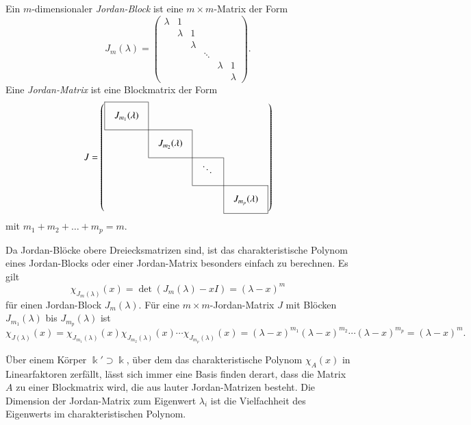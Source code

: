 \begin{definition}
Ein $m$-dimensionaler {\em Jordan-Block} ist eine $m\times m$-Matrix
%
der Form
\[
J_m(\lambda)
=
\begin{pmatrix}
\lambda &    1    &         &        &         &         \\
        & \lambda &    1    &        &         &         \\
        &         & \lambda &        &         &         \\
        &         &         & \ddots &         &         \\
        &         &         &        & \lambda &     1   \\
        &         &         &        &         & \lambda 
\end{pmatrix}.
\]
Eine {\em Jordan-Matrix} ist eine Blockmatrix der Form
\[
J
=
\def\temp#1{\multicolumn{1}{|c}{\raisebox{0pt}[17pt][12pt]{\phantom{x}$#1\mathstrut$}\phantom{x}}}
\left(
\begin{array}{cccc}
\cline{1-1}
\temp{J_{m_1}(\lambda)} &\multicolumn{1}{|c}{}&        &           \\
\cline{1-2}
          &\temp{J_{m_2}(\lambda)}&\multicolumn{1}{|c}{}&           \\
\cline{2-3}
          &           &\temp{\ddots}&\multicolumn{1}{|c}{}\\
\cline{3-4}
          &           &        &\multicolumn{1}{|c|}{\raisebox{0pt}[17pt][12pt]{\phantom{x}$J_{m_p}(\lambda)$}\phantom{x}}\\
\cline{4-4}
\end{array}
\right)
\]
mit $m_1+m_2+\dots+m_p=m$.
%
\end{definition}

Da Jordan-Blöcke obere Dreiecksmatrizen sind, ist
das charakteristische Polynom eines Jordan-Blocks oder einer Jordan-Matrix
besonders einfach zu berechnen.
Es gilt
\[
\chi_{J_m(\lambda)}(x)
=
\det (J_m(\lambda) - xI)
=
(\lambda-x)^m
\]
für einen Jordan-Block $J_m(\lambda)$.
Für eine $m\times m$-Jordan-Matrix $J$ mit Blöcken $J_{m_1}(\lambda)$
bis $J_{m_p}(\lambda)$ ist
\[
\chi_{J(\lambda)}(x)
=
\chi_{J_{m_1}(\lambda)}(x)
\chi_{J_{m_2}(\lambda)}(x)
\cdots
\chi_{J_{m_p}(\lambda)}(x)
=
(\lambda-x)^{m_1}
(\lambda-x)^{m_2}
\cdots
(\lambda-x)^{m_p}
=
(\lambda-x)^m.
\]

\begin{satz}
\label{buch:eigenwerte:satz:jordannormalform}
Über einem Körper $\Bbbk'\supset\Bbbk$, über dem das charakteristische
Polynom $\chi_A(x)$ in Linearfaktoren zerfällt, lässt sich immer
eine Basis finden derart, dass die Matrix $A$ zu einer Blockmatrix wird,
die aus lauter Jordan-Matrizen besteht.
Die Dimension der Jordan-Matrix zum Eigenwert $\lambda_i$ ist die
Vielfachheit des Eigenwerts im charakteristischen Polynom.
\end{satz}

